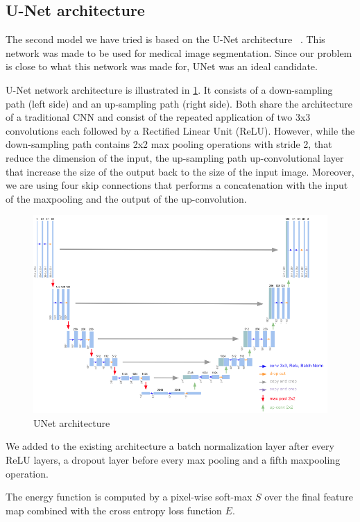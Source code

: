 \documentclass[10pt,conference,compsocconf]{IEEEtran}
\begin{document}
\subsection{U-Net architecture}
The second model we have tried is based on the U-Net architecture ~\cite{unet}. This network was made to be used for medical image segmentation. Since our problem is close to what this network was made for, UNet was an ideal candidate.

U-Net network architecture is illustrated in \ref{fig:unet}. It consists of a down-sampling path (left side) and an up-sampling path (right side). Both share the architecture of a traditional CNN and consist of the repeated application of two 3x3 convolutions each followed by a Rectified Linear Unit (ReLU). However, while the down-sampling path contains 2x2 max pooling operations with stride 2, that reduce the dimension of the input, the up-sampling path up-convolutional layer that increase the size of the output back to the size of the input image. Moreover, we are using four skip connections that performs a concatenation with the input of the maxpooling and the output of the up-convolution.

\begin{figure}[h]
  \centering
  \includegraphics[width=0.95\columnwidth]{img/unet.png}
  \caption{UNet architecture}
  \label{fig:unet}
\end{figure}

We added to the existing architecture a batch normalization layer after every ReLU layers, a dropout layer before every max pooling and a fifth maxpooling operation.

The energy function is computed by a pixel-wise soft-max $S$ over the final feature map combined with the cross entropy loss function $E$.
\end{document}
